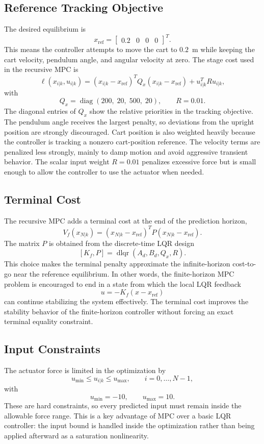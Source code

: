 \documentclass[conference]{IEEEtran}
\begin{document}
\subsection{Reference Tracking Objective}
The desired equilibrium is
\[
x_{\mathrm{ref}} =
\begin{bmatrix}
0.2 & 0 & 0 & 0
\end{bmatrix}^{T}.
\]
This means the controller attempts to move the cart to $0.2$~m while keeping the cart velocity, pendulum angle, and angular velocity at zero. The stage cost used in the recursive MPC is
\[
\ell(x_{i|k},u_{i|k})
=
(x_{i|k}-x_{\mathrm{ref}})^T Q_x (x_{i|k}-x_{\mathrm{ref}})
+ u_{i|k}^T R u_{i|k},
\]
with
\[
Q_x =
\operatorname{diag}(200,\;20,\;500,\;20),
\qquad
R = 0.01.
\]
The diagonal entries of $Q_x$ show the relative priorities in the tracking objective. The pendulum angle receives the largest penalty, so deviations from the upright position are strongly discouraged. Cart position is also weighted heavily because the controller is tracking a nonzero cart-position reference. The velocity terms are penalized less strongly, mainly to damp motion and avoid aggressive transient behavior. The scalar input weight $R=0.01$ penalizes excessive force but is small enough to allow the controller to use the actuator when needed.

\subsection{Terminal Cost}
The recursive MPC adds a terminal cost at the end of the prediction horizon,
\[
V_f(x_{N|k})
=
(x_{N|k}-x_{\mathrm{ref}})^T P (x_{N|k}-x_{\mathrm{ref}}).
\]
The matrix $P$ is obtained from the discrete-time LQR design
\[
[K_f,P] = \operatorname{dlqr}(A_d,B_d,Q_x,R).
\]
This choice makes the terminal penalty approximate the infinite-horizon cost-to-go near the reference equilibrium. In other words, the finite-horizon MPC problem is encouraged to end in a state from which the local LQR feedback
\[
u = -K_f(x-x_{\mathrm{ref}})
\]
can continue stabilizing the system effectively. The terminal cost improves the stability behavior of the finite-horizon controller without forcing an exact terminal equality constraint.

\subsection{Input Constraints}
The actuator force is limited in the optimization by
\[
u_{\min} \le u_{i|k} \le u_{\max},
\qquad i=0,\ldots,N-1,
\]
with
\[
u_{\min}=-10,\qquad u_{\max}=10.
\]
These are hard constraints, so every predicted input must remain inside the allowable force range. This is a key advantage of MPC over a basic LQR controller: the input bound is handled inside the optimization rather than being applied afterward as a saturation nonlinearity.
\end{document}
